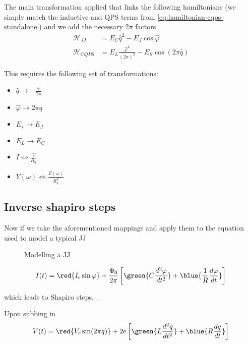 The main transformation applied that links the following hamiltonians (we simply
match the inductive and QPS terms from \autoref{eq:hamiltonian-cqps-standalone})
and we add the necessary 2$\pi$ factors
\begin{equation}
  \begin{aligned}
    \mathcal{H}_{JJ} & = E_C\hat{q}^2 - E_J\cos\hat{\varphi} \\
    \mathcal{H}_{CQPS}     &    =     E_L\frac{\hat{\varphi}^2}{(2\pi)^{2}}    -
    E_S\cos(2\pi\hat{q})
  \end{aligned}
\end{equation}

\noindent This requires the following set of transformations:

\begin{itemize}
\item $\hat{q} \rightarrow - \frac{\varphi}{2\pi}$
\item $\hat{\varphi} \rightarrow 2\pi q$
\item $E_s \rightarrow E_J$
\item $E_L \rightarrow E_C$
\item $I \Leftrightarrow \frac{V}{R_{q}}$
\item $Y(\omega) \Leftrightarrow \frac{Z(\omega)}{R_q^2}$
\end{itemize}

\subsection{Inverse shapiro steps}
\label{sec:inverse-shap-steps}

Now if we take  the aforementioned mappings and apply them  to the equation used
to model a typical JJ

\begin{figure}[h]
  \centering {}
  \caption{\small Modelling a JJ\label{fig:typical_jj_setup}}
\end{figure}

\begin{equation}
  I(t) = \red{I_c\sin\varphi} + \frac{\Phi_{0}}{2\pi}\left[ \green{C \frac{d^2\varphi}{dt^{2}}} + \blue{\frac{1}{R}\frac{d\varphi}{dt}} \right]
\end{equation}

\noindent which  leads to  Shapiro steps.   .

Upon subbing in
\begin{equation}
  V(t) = \red{V_c\sin(2\pi q)} + 2e\left[ \green{L \frac{d^2q}{dt^{2}}} + \blue{R\frac{dq}{dt}} \right]
\end{equation}

